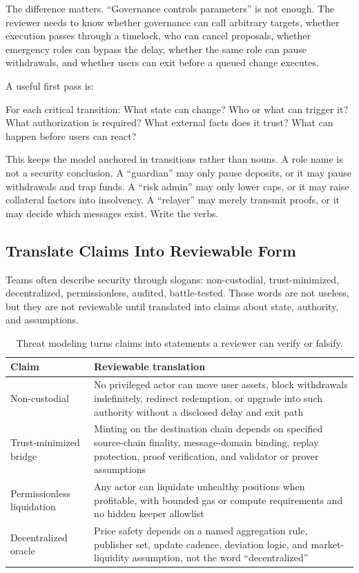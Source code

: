 The difference matters. ``Governance controls parameters'' is not enough. The reviewer needs to know whether governance can call arbitrary targets, whether execution passes through a timelock, who can cancel proposals, whether emergency roles can bypass the delay, whether the same role can pause withdrawals, and whether users can exit before a queued change executes.

A useful first pass is:

\begin{codeblock}
For each critical transition:
    What state can change?
    Who or what can trigger it?
    What authorization is required?
    What external facts does it trust?
    What can happen before users can react?
\end{codeblock}

This keeps the model anchored in transitions rather than nouns. A role name is not a security conclusion. A ``guardian'' may only pause deposits, or it may pause withdrawals and trap funds. A ``risk admin'' may only lower caps, or it may raise collateral factors into insolvency. A ``relayer'' may merely transmit proofs, or it may decide which messages exist. Write the verbs.

\subsection{Translate Claims Into Reviewable Form}

Teams often describe security through slogans: non-custodial, trust-minimized, decentralized, permissionless, audited, battle-tested. Those words are not useless, but they are not reviewable until translated into claims about state, authority, and assumptions.

\begin{table}[htbp]
\centering
\small
\renewcommand{\arraystretch}{1.18}
\begin{tabularx}{\textwidth}{@{}>{\RaggedRight\arraybackslash}p{}X@{}}
\toprule
Claim & Reviewable translation \\
\midrule
Non-custodial & No privileged actor can move user assets, block withdrawals indefinitely, redirect redemption, or upgrade into such authority without a disclosed delay and exit path \\
Trust-minimized bridge & Minting on the destination chain depends on specified source-chain finality, message-domain binding, replay protection, proof verification, and validator or prover assumptions \\
Permissionless liquidation & Any actor can liquidate unhealthy positions when profitable, with bounded gas or compute requirements and no hidden keeper allowlist \\
Decentralized oracle & Price safety depends on a named aggregation rule, publisher set, update cadence, deviation logic, and market-liquidity assumption, not the word ``decentralized'' \\
\bottomrule
\end{tabularx}
\caption{Threat modeling turns claims into statements a reviewer can verify or falsify.}
\end{table}

